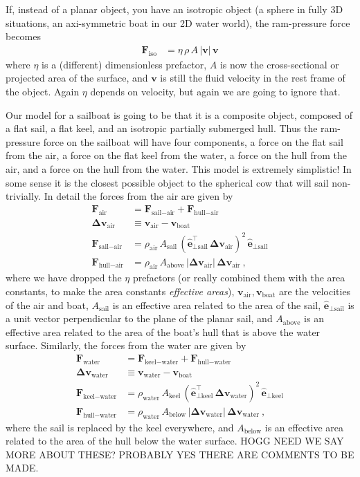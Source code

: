 \documentclass[letterpaper]{article}
\renewcommand{\vec}[1]{\boldsymbol{#1}}
\newcommand{\uvec}{\vec{\hat{e}}}
\newcommand{\iso}{\text{iso}}
\newcommand{\air}{\text{air}}
\newcommand{\water}{\text{water}}
\newcommand{\boat}{\text{boat}}
\newcommand{\sail}{\text{sail}}
\newcommand{\keel}{\text{keel}}
\newcommand{\hull}{\text{hull}}
\renewcommand{\above}{\text{above}}
\newcommand{\below}{\text{below}}
\newcommand{\vair}{\vec{v}_\air}
\newcommand{\vwater}{\vec{v}_\water}
\newcommand{\vboat}{\vec{v}_\boat}
\begin{document}
If, instead of a planar object, you have an isotropic object (a sphere in fully 3D situations, an axi-symmetric boat in our 2D water world), the ram-pressure force becomes
\begin{align}\label{eq:iso}
    \vec{F}_\iso &= \eta\,\rho\,A\,|\vec{v}|\,\vec{v}
\end{align}
where $\eta$ is a (different) dimensionless prefactor, $A$ is now the cross-sectional or projected area of the surface, and $\vec{v}$ is still the fluid velocity in the rest frame of the object.
Again $\eta$ depends on velocity, but again we are going to ignore that.

Our model for a sailboat is going to be that it is a composite object, composed of a flat sail, a flat keel, and an isotropic partially submerged hull.
Thus the ram-pressure force on the sailboat will have four components, a force on the flat sail from the air, a force on the flat keel from the water, a force on the hull from the air, and a force on the hull from the water.
This model is extremely simplistic!
In some sense it is the closest possible object to the spherical cow that will sail non-trivially.
In detail the forces from the air are given by
\begin{align}\label{eq:startmodel}
  \vec{F}_\air &= \vec{F}_{\sail-\air} + \vec{F}_{\hull-\air}
  \\
  \vec{\Delta v}_\air &\equiv \vair - \vboat \label{eq:deltav}
  \\
  \vec{F}_{\sail-\air} & = \rho_\air\,A_\sail\,(\uvec_{\perp\sail}^\top\,\vec{\Delta v}_\air)^2\,\uvec_{\perp\sail} \label{eq:Fsailair}
  \\
  \vec{F}_{\hull-\air} & = \rho_\air\,A_{\above}\,|\vec{\Delta v}_\air|\,\vec{\Delta v}_\air \label{eq:Fhullair} ~,
\end{align}
where we have dropped the $\eta$ prefactors (or really combined them with the area constants, to make the area constants \emph{effective areas}), $\vair,\vboat$ are the velocities of the air and boat, $A_\sail$ is an effective area related to the area of the sail, $\uvec_{\perp\sail}$ is a unit vector perpendicular to the plane of the planar sail, and $A_{\above}$ is an effective area related to the area of the boat's hull that is above the water surface.
Similarly, the forces from the water are given by
\begin{align}
  \vec{F}_\water &= \vec{F}_{\keel-\water} + \vec{F}_{\hull-\water}
  \\
  \vec{\Delta v}_\water &\equiv \vwater - \vboat
  \\
  \vec{F}_{\keel-\water} & = \rho_\water\,A_\keel\,(\uvec_{\perp\keel}^\top\,\vec{\Delta v}_\water)^2\,\uvec_{\perp\keel}
  \\
  \vec{F}_{\hull-\water} & = \rho_\water\,A_{\below}\,|\vec{\Delta v}_\water|\,\vec{\Delta v}_\water ~,\label{eq:endmodel}
\end{align}
where the sail is replaced by the keel everywhere, and $A_{\below}$ is an effective area related to the area of the hull below the water surface.
HOGG NEED WE SAY MORE ABOUT THESE? PROBABLY YES THERE ARE COMMENTS TO BE MADE.
\end{document}
